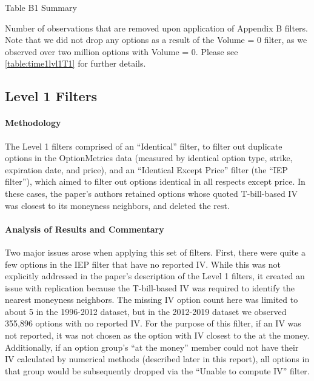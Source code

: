 \thispagestyle{empty}
\begin{landscape}

\begin{table}
  \centering
  \caption{Table B1 Summary}
  \resizebox{1.4\textwidth}{!}{
  \hspace*{-4cm}
  
  }
  \caption*{
    Number of observations that are removed upon application of Appendix B filters. Note that we did not drop any options as a result of the Volume = 0 filter, as we observed over two million options with Volume = 0. Please see \autoref{table:time1lvl1T1} for further details.
  }
  \label{table:tableB1}
\end{table}

\vfill
\raisebox{-3cm}{\makebox[\linewidth]{\thepage}}
\end{landscape}

\newpage
\subsection{Level 1 Filters} 


\paragraph{Methodology}


The Level 1 filters comprised of an ``Identical'' filter, to filter out duplicate options in the OptionMetrics data (measured by identical option type, strike, expiration date, and price), and an ``Identical Except Price'' filter (the ``IEP filter''), which aimed to filter out options identical in all respects except price. In these cases, the paper's authors retained options whose quoted T-bill-based IV was closest to its moneyness neighbors, and deleted the rest.

\paragraph{Analysis of Results and Commentary}
Two major issues arose when applying this set of filters. First, there were quite a few options in the IEP filter that have no reported IV. While this was not explicitly addressed in the paper's description of the Level 1 filters, it created an issue with replication because the T-bill-based IV was required to identify the nearest moneyness neighbors. The missing IV option count here was limited to about 5 in the 1996-2012 dataset, but in the 2012-2019 dataset we observed 355,896 options with no reported IV. For the purpose of this filter, if an IV was not reported, it was not chosen as the option with IV closest to the at the money. Additionally, if an option group's ``at the money'' member could not have their IV calculated by numerical methods (described later in this report), all options in that group would be subsequently dropped via the ``Unable to compute IV'' filter. 


